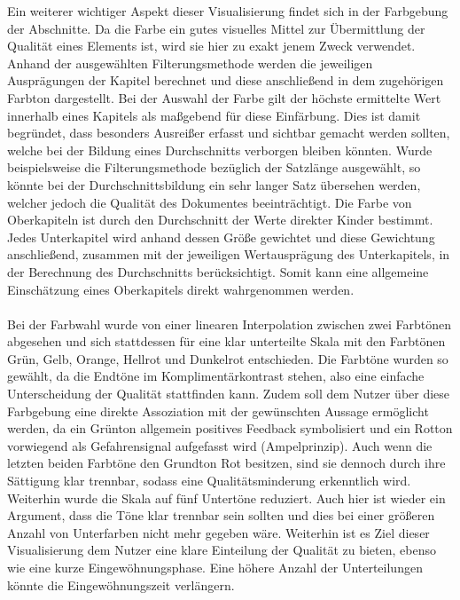 Ein weiterer wichtiger Aspekt dieser Visualisierung findet sich in der Farbgebung der Abschnitte. Da die Farbe ein gutes visuelles Mittel zur \"Ubermittlung der Qualit\"at eines Elements ist, wird sie hier zu exakt jenem Zweck verwendet. Anhand der ausgew\"ahlten Filterungsmethode werden die jeweiligen Auspr\"agungen der Kapitel berechnet und diese anschlie{\ss}end in dem zugeh\"origen Farbton dargestellt. Bei der Auswahl der Farbe gilt der h\"ochste ermittelte Wert innerhalb eines Kapitels als ma{\ss}gebend f\"ur diese Einf\"arbung. Dies ist damit begr\"undet, dass besonders Ausrei{\ss}er erfasst und sichtbar gemacht werden sollten, welche bei der Bildung eines Durchschnitts verborgen bleiben k\"onnten. Wurde beispielsweise die Filterungsmethode bez\"uglich der Satzl\"ange ausgew\"ahlt, so k\"onnte bei der Durchschnittsbildung ein sehr langer Satz \"ubersehen werden, welcher jedoch die Qualit\"at des Dokumentes beeintr\"achtigt. Die Farbe von Oberkapiteln ist durch den Durchschnitt der Werte direkter Kinder bestimmt. Jedes Unterkapitel wird anhand dessen Gr\"o{\ss}e gewichtet und diese Gewichtung anschlie{\ss}end, zusammen mit der jeweiligen Wertauspr\"agung des Unterkapitels, in der Berechnung des Durchschnitts ber\"ucksichtigt. Somit kann eine allgemeine Einsch\"atzung eines Oberkapitels direkt wahrgenommen werden.\\
\\
Bei der Farbwahl wurde von einer linearen Interpolation zwischen zwei Farbt\"onen abgesehen und sich stattdessen f\"ur eine klar unterteilte Skala mit den Farbt\"onen Gr\"un, Gelb, Orange, Hellrot und Dunkelrot entschieden. Die Farbt\"one wurden so gew\"ahlt, da die Endt\"one im Kompliment\"arkontrast stehen, also eine einfache Unterscheidung der Qualit\"at stattfinden kann. Zudem soll dem Nutzer \"uber diese Farbgebung eine direkte Assoziation mit der gew\"unschten Aussage erm\"oglicht werden, da ein Gr\"unton allgemein positives Feedback symbolisiert und ein Rotton vorwiegend als Gefahrensignal aufgefasst wird (Ampelprinzip). Auch wenn die letzten beiden Farbt\"one den Grundton Rot besitzen, sind sie dennoch durch ihre S\"attigung klar trennbar, sodass eine Qualit\"atsminderung erkenntlich wird. Weiterhin wurde die Skala auf f\"unf Untert\"one reduziert. Auch hier ist wieder ein Argument, dass die T\"one klar trennbar sein sollten und dies bei einer gr\"o{\ss}eren Anzahl von Unterfarben nicht mehr gegeben w\"are. Weiterhin ist es Ziel dieser Visualisierung dem Nutzer eine klare Einteilung der Qualit\"at zu bieten, ebenso wie eine kurze Eingew\"ohnungsphase. Eine h\"ohere Anzahl der Unterteilungen k\"onnte die Eingew\"ohnungszeit verl\"angern.\\

